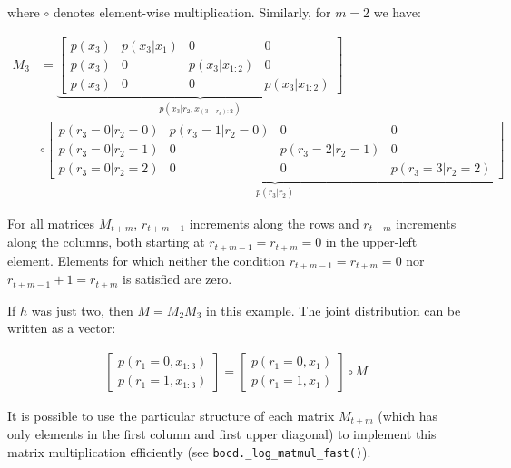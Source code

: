 \documentclass{article}
\begin{document}
where $\circ$ denotes element-wise multiplication. Similarly, for $m=2$ we have:

\begin{align}M_{3} & =\underbrace{\left[\begin{array}{cccc}
p(x_{3}) & p(x_{3}\vert x_{1}) & 0 & 0\\
p(x_{3}) & 0 & p(x_{3}\vert x_{1:2}) & 0\\
p(x_{3}) & 0 & 0 & p(x_{3}\vert x_{1:2})
\end{array}\right]}_{p(x_{3}\vert r_{2},x_{(3-r_{3}):2})}\\
 & \circ\underbrace{\left[\begin{array}{cccc}
p(r_{3}=0\vert r_{2}=0) & p(r_{3}=1\vert r_{2}=0) & 0 & 0\\
p(r_{3}=0\vert r_{2}=1) & 0 & p(r_{3}=2\vert r_{2}=1) & 0\\
p(r_{3}=0\vert r_{2}=2) & 0 & 0 & p(r_{3}=3\vert r_{2}=2)
\end{array}\right]}_{p(r_{3}\vert r_{2})}
\end{align}

For all matrices $M_{t+m}$, $r_{t+m-1}$ increments along the rows and $r_{t+m}$ increments along the columns, both starting at $r_{t+m-1}=r_{t+m}=0$ in the upper-left element. Elements for which neither the condition $r_{t+m-1}=r_{t+m}=0$ nor $r_{t+m-1}+1=r_{t+m}$ is satisfied are zero.

If $h$ was just two, then $M=M_{2}M_{3}$ in this example. The joint distribution can be written as a vector:

\begin{align}
\left[\begin{array}{c}
p(r_{1}=0,x_{1:3})\\
p(r_{1}=1,x_{1:3})
\end{array}\right]=\left[\begin{array}{c}
p(r_{1}=0,x_{1})\\
p(r_{1}=1,x_{1})
\end{array}\right]\circ M
\end{align}

It is possible to use the particular structure of each matrix $M_{t+m}$ (which has only elements in the first column and first upper diagonal) to implement this matrix multiplication efficiently (see \texttt{bocd.\_log\_matmul\_fast()}).
\end{document}
